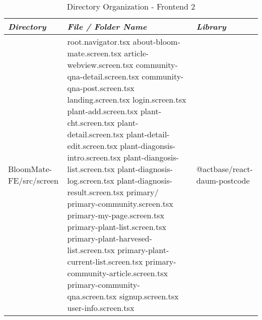 \documentclass[conference, a4paper]{IEEEtran}
\begin{document}
\begin{table} [htp]
    \caption{Directory Organization - Frontend 2}
    \centering
    \renewcommand{\arraystretch}{1.3}
    \begin{tabular}{p{1.7cm}|p{2.8cm}|p{2.5cm}}
    \hline
    \textit{\textbf{Directory}} & \textit{\textbf{File / Folder Name}} & \textit{\textbf{Library}} \\
     \hline
 BloomMate-FE\newline/src/screen & root.navigator.tsx \newline  \newline about-bloom-mate.screen.tsx
 \newline article-webview.screen.tsx \newline community-qna-detail.screen.tsx \newline community-qna-post.screen.tsx \newline landing.screen.tsx \newline login.screen.tsx \newline plant-add.screen.tsx \newline plant-cht.screen.tsx \newline plant-detail.screen.tsx \newline plant-detail-edit.screen.tsx \newline plant-diagonsis-intro.screen.tsx \newline plant-diangosis-list.screen.tsx \newline plant-diagnosis-log.screen.tsx \newline plant-diagnosis-result.screen.tsx
 \newline primary/ \newline primary-community.screen.tsx \newline primary-my-page.screen.tsx
 \newline primary-plant-list.screen.tsx \newline primary-plant-harvesed-list.screen.tsx \newline primary-plant-current-list.screen.tsx \newline primary-community-article.screen.tsx \newline primary-community-qna.screen.tsx \newline signup.screen.tsx \newline user-info.screen.tsx & @actbase/react-daum-postcode

\end{tabular}
\end{table}
\end{document}
